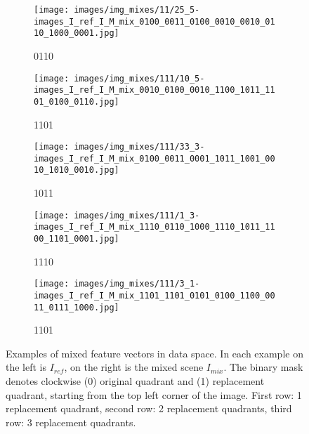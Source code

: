 \documentclass[12pt,a4paper]{article}
\begin{document}
\begin{figure}[h!]
\begin{subfigure}[b]{0.23\textwidth}
     \end{subfigure}
     \hfill
     \begin{subfigure}[b]{0.23\textwidth}
         \centering
         \texttt{[image: images/img\_mixes/11/25\_5-images\_I\_ref\_I\_M\_mix\_0100\_0011\_0100\_0010\_0010\_0110\_1000\_0001.jpg]}
         \caption{0110}
         \label{fig:quad_repl_ex_2_4}
     \end{subfigure}
     \begin{subfigure}[b]{0.23\textwidth}
         \centering
         \texttt{[image: images/img\_mixes/111/10\_5-images\_I\_ref\_I\_M\_mix\_0010\_0100\_0010\_1100\_1011\_1101\_0100\_0110.jpg]}
         \caption{1101}
         \label{fig:quad_repl_ex_3_1}
     \end{subfigure}
     \hfill     
     \begin{subfigure}[b]{0.23\textwidth}
         \centering
         \texttt{[image: images/img\_mixes/111/33\_3-images\_I\_ref\_I\_M\_mix\_0100\_0011\_0001\_1011\_1001\_0010\_1010\_0010.jpg]}
         \caption{1011}
         \label{fig:quad_repl_ex_3_2}
     \end{subfigure}
     \hfill
     \begin{subfigure}[b]{0.23\textwidth}
         \centering
         \texttt{[image: images/img\_mixes/111/1\_3-images\_I\_ref\_I\_M\_mix\_1110\_0110\_1000\_1110\_1011\_1100\_1101\_0001.jpg]}
         \caption{1110}
         \label{fig:quad_repl_ex_3_3}
     \end{subfigure}
     \hfill
     \begin{subfigure}[b]{0.23\textwidth}
         \centering
         \texttt{[image: images/img\_mixes/111/3\_1-images\_I\_ref\_I\_M\_mix\_1101\_1101\_0101\_0100\_1100\_0011\_0111\_1000.jpg]}
         \caption{1101}
         \label{fig:quad_repl_ex_3_4}
     \end{subfigure}     
    \caption{Examples of mixed feature vectors in data space. In each example on the left is $I_{ref}$, on the right is the mixed scene $I_{mix}$. The binary mask denotes clockwise (0) original quadrant and (1) replacement quadrant, starting from the top left corner of the image. First row: 1 replacement quadrant, second row: 2 replacement quadrants, third row: 3 replacement quadrants.}
    \label{fig:quad_repl_ex}
\end{figure}


\end{document}
